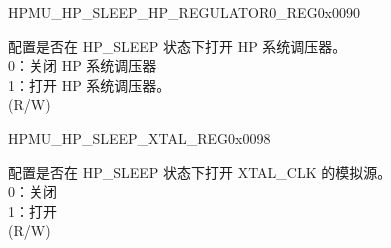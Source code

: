 \begin{register}{H}{PMU\_HP\_SLEEP\_HP\_REGULATOR0\_REG}{0x0090}\label{regdesc:PMUHPSLEEPHPREGULATOR0REG}
%
%
%
\regnewline%
\begin{regdesc}\begin{reglist}
\label{fielddesc:PMUHPSLEEPHPREGULATORXPD}\item [PMU\_HP\_SLEEP\_HP\_REGULATOR\_XPD] 配置是否在 HP\_SLEEP 状态下打开 HP 系统调压器。\\
0：关闭 HP 系统调压器 \\
1：打开 HP 系统调压器。\\
(R/W)
\end{reglist}\end{regdesc}
\end{register}


\begin{register}{H}{PMU\_HP\_SLEEP\_XTAL\_REG}{0x0098}\label{regdesc:PMUHPSLEEPXTALREG}
%
%
\regnewline%
\begin{regdesc}\begin{reglist}
\label{fielddesc:PMUHPSLEEPXPDXTAL}\item [PMU\_HP\_SLEEP\_XPD\_XTAL] 配置是否在 HP\_SLEEP 状态下打开 XTAL\_CLK 的模拟源。\\
0：关闭\\
1：打开\\
(R/W)
\end{reglist}\end{regdesc}
\end{register}



